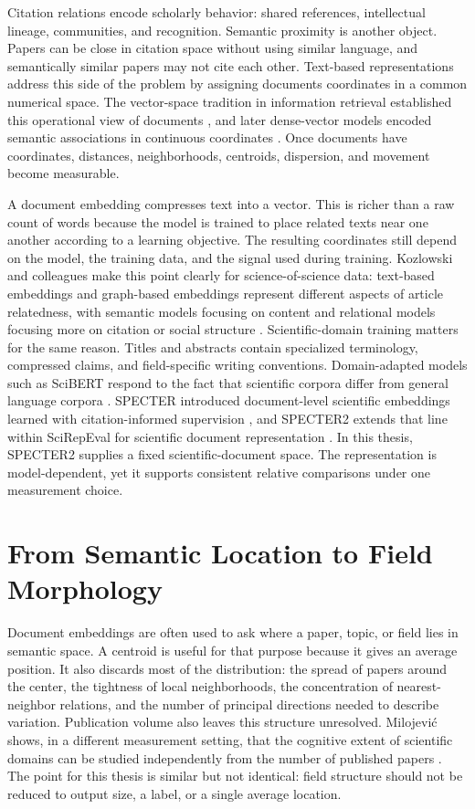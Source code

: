 Citation relations encode scholarly behavior: shared references, intellectual lineage, communities, and recognition. Semantic proximity is another object. Papers can be close in citation space without using similar language, and semantically similar papers may not cite each other. Text-based representations address this side of the problem by assigning documents coordinates in a common numerical space. The vector-space tradition in information retrieval established this operational view of documents \parencite{salton1983vector}, and later dense-vector models encoded semantic associations in continuous coordinates \parencite{mikolov2013word2vec}. Once documents have coordinates, distances, neighborhoods, centroids, dispersion, and movement become measurable.

A document embedding compresses text into a vector. This is richer than a raw count of words because the model is trained to place related texts near one another according to a learning objective. The resulting coordinates still depend on the model, the training data, and the signal used during training. Kozlowski and colleagues make this point clearly for science-of-science data: text-based embeddings and graph-based embeddings represent different aspects of article relatedness, with semantic models focusing on content and relational models focusing more on citation or social structure \parencite{kozlowski2021semantic}. Scientific-domain training matters for the same reason. Titles and abstracts contain specialized terminology, compressed claims, and field-specific writing conventions. Domain-adapted models such as SciBERT respond to the fact that scientific corpora differ from general language corpora \parencite{beltagy2019scibert}. SPECTER introduced document-level scientific embeddings learned with citation-informed supervision \parencite{cohan2020specter}, and SPECTER2 extends that line within SciRepEval for scientific document representation \parencite{singh2023scirepeval}. In this thesis, SPECTER2 supplies a fixed scientific-document space. The representation is model-dependent, yet it supports consistent relative comparisons under one measurement choice.

\section{From Semantic Location to Field Morphology}

Document embeddings are often used to ask where a paper, topic, or field lies in semantic space. A centroid is useful for that purpose because it gives an average position. It also discards most of the distribution: the spread of papers around the center, the tightness of local neighborhoods, the concentration of nearest-neighbor relations, and the number of principal directions needed to describe variation. Publication volume also leaves this structure unresolved. Milojevi{\'c} shows, in a different measurement setting, that the cognitive extent of scientific domains can be studied independently from the number of published papers \parencite{milojevic2015cognitive}. The point for this thesis is similar but not identical: field structure should not be reduced to output size, a label, or a single average location.

